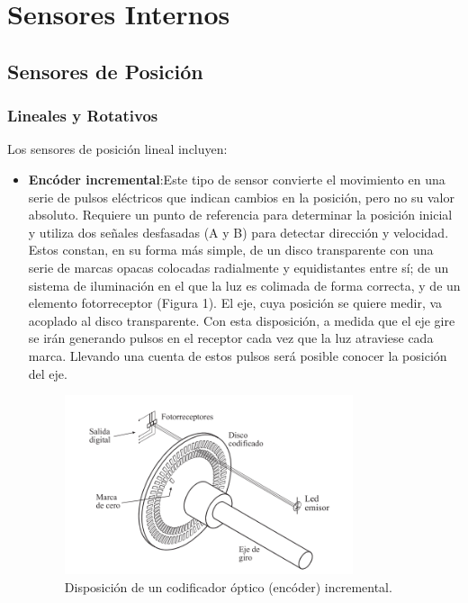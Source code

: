 \documentclass{article}
\begin{document}
	\section{Sensores Internos}
	\subsection{Sensores de Posición}
	\subsubsection{Lineales y Rotativos}
	Los sensores de posición lineal incluyen:
	
	\begin{itemize}
		\item \textbf{Encóder incremental}:Este tipo de sensor convierte el movimiento en una serie de pulsos eléctricos que indican cambios en la posición, pero no su valor absoluto. Requiere un punto de referencia para determinar la posición inicial y utiliza dos señales desfasadas (A y B) para detectar dirección y velocidad. Estos constan, en su forma más simple, de un
		disco transparente con una serie de marcas opacas colocadas radialmente y equidistantes entre sí; de un sistema de iluminación en el que la luz es colimada de forma correcta, y de un elemento fotorreceptor (Figura 1). El eje, cuya posición se quiere medir, va acoplado al disco transparente. Con esta disposición, a medida que el eje gire se irán generando pulsos en el receptor cada vez que la luz atraviese cada marca. Llevando una cuenta de estos pulsos será posible conocer la posición del eje.
		\begin{figure}[H]
			\centering
			\includegraphics[width=0.8\textwidth]{encoderincremental.png}
			\caption{Disposición de un codificador óptico (encóder) incremental.}
			\label{fig:encoderincremental}
		\end{figure}
		

\end{itemize}
\end{document}
